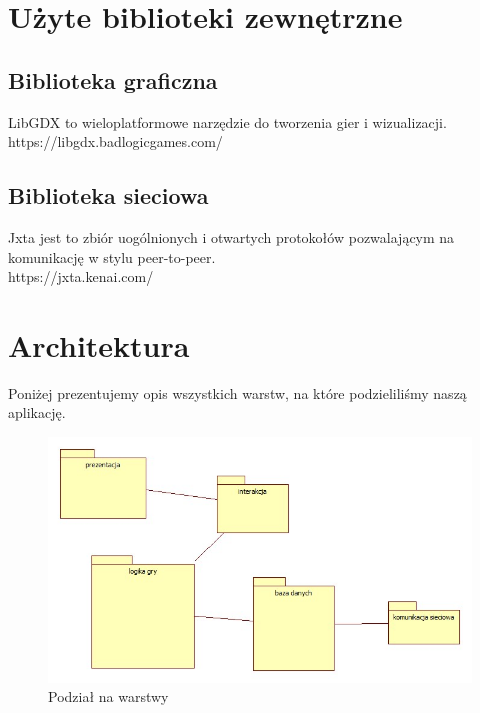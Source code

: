 \documentclass[a4paper, 11pt]{article}
\begin{document}
	
	\section{Użyte biblioteki zewnętrzne}
	\subsection{Biblioteka graficzna}
	LibGDX to wieloplatformowe narzędzie do tworzenia gier i wizualizacji.\\
	 https://libgdx.badlogicgames.com/
	\subsection{Biblioteka sieciowa}
	Jxta jest to zbiór uogólnionych i otwartych protokołów pozwalającym na komunikację w stylu peer-to-peer. \\
	https://jxta.kenai.com/
	\section{Architektura}
	\indent
	
	Poniżej prezentujemy opis wszystkich warstw, na które podzieliliśmy naszą aplikację.
	\begin{figure}[H]%
		\includegraphics[scale=0.5]{uml/main.jpg}\caption{Podział na warstwy}
	\end{figure}
\end{document}
